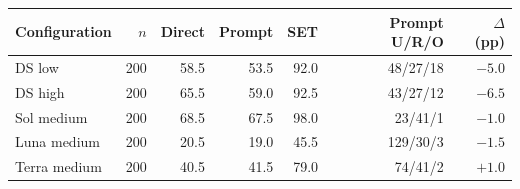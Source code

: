\begin{tabular}{@{}lrrrrrr@{}}
\toprule
Configuration & $n$ & Direct & Prompt & SET & Prompt U/R/O & $\Delta$ (pp)\\
\midrule
DS low & 200 & 58.5 & 53.5 & 92.0 & 48/27/18 & $-5.0$\\
DS high & 200 & 65.5 & 59.0 & 92.5 & 43/27/12 & $-6.5$\\
Sol medium & 200 & 68.5 & 67.5 & 98.0 & 23/41/1 & $-1.0$\\
Luna medium & 200 & 20.5 & 19.0 & 45.5 & 129/30/3 & $-1.5$\\
Terra medium & 200 & 40.5 & 41.5 & 79.0 & 74/41/2 & $+1.0$\\
\bottomrule
\end{tabular}
